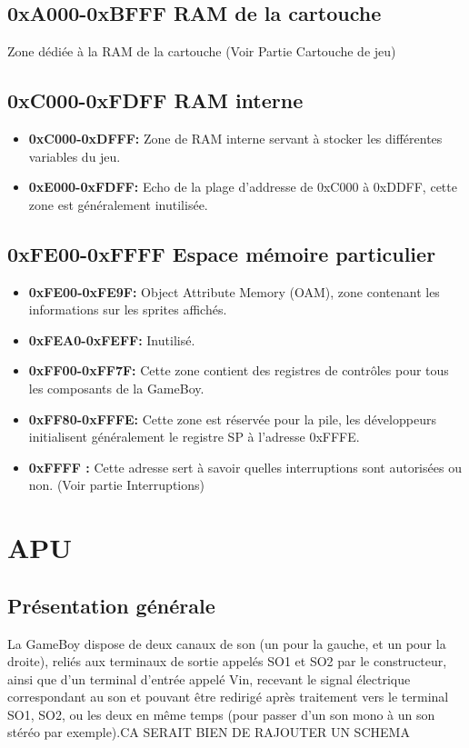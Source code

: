 \documentclass{report}
\begin{document}
\subsection{0xA000-0xBFFF RAM de la cartouche}
Zone dédiée à la RAM de la cartouche (Voir Partie Cartouche de jeu)

\subsection{0xC000-0xFDFF RAM interne}
\begin{itemize}
\item \textbf{0xC000-0xDFFF:} Zone de RAM interne servant à stocker les différentes variables du jeu.
\item \textbf{0xE000-0xFDFF:} Echo de la plage d'addresse de 0xC000 à 0xDDFF, cette zone est
généralement inutilisée.
\end{itemize} 

\subsection{0xFE00-0xFFFF Espace mémoire particulier}

\begin{itemize}
\item \textbf{0xFE00-0xFE9F:} Object Attribute Memory (OAM), zone contenant les informations
sur les sprites affichés.
\item \textbf{0xFEA0-0xFEFF:} Inutilisé.
\item \textbf{0xFF00-0xFF7F:} Cette zone contient des registres de contrôles pour tous les composants de la
GameBoy.
\item \textbf{0xFF80-0xFFFE:} Cette zone est réservée pour la pile, les
développeurs initialisent généralement le registre SP à l'adresse 0xFFFE.
\item \textbf{0xFFFF :} Cette adresse sert à savoir quelles interruptions sont autorisées ou
non. (Voir partie Interruptions)
\end{itemize} 

\section{APU}
\subsection{Présentation générale}
	La GameBoy dispose de deux canaux de son (un pour la gauche,
	et un pour la droite), reliés aux terminaux de sortie appelés
	SO1 et SO2 par le constructeur, ainsi que d'un terminal
	d'entrée appelé Vin, recevant le signal électrique
	correspondant au son et pouvant être redirigé après
	traitement vers le terminal SO1, SO2, ou les deux en même
	temps (pour passer d'un son mono à un son stéréo par
	exemple).CA SERAIT BIEN DE RAJOUTER UN SCHEMA\\
\end{document}
